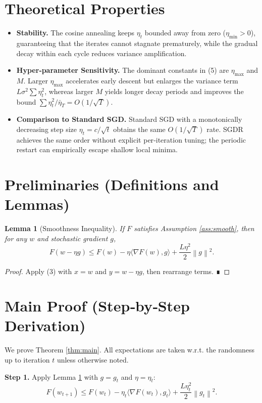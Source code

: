 \documentclass{article}
\newtheorem{lemma}{Lemma}
\newcommand{\norm}[1]{\left\|#1\right\|}
\newcommand{\ip}[2]{\langle #1,#2\rangle}
\begin{document}
\section*{Theoretical Properties}
\begin{itemize}[leftmargin=*]
\item \textbf{Stability.} The cosine annealing keeps $\eta_t$ bounded away from zero ($\eta_{\min}>0$), guaranteeing that the iterates cannot stagnate prematurely, while the gradual decay within each cycle reduces variance amplification.
\item \textbf{Hyper‑parameter Sensitivity.} The dominant constants in (5) are $\eta_{\max}$ and $M$. Larger $\eta_{\max}$ accelerates early descent but enlarges the variance term $L\sigma^2\sum\eta_t^2$, whereas larger $M$ yields longer decay periods and improves the bound $\sum\eta_t^2/\bar\eta_T=O(1/\sqrt{T})$.
\item \textbf{Comparison to Standard SGD.} Standard SGD with a monotonically decreasing step size $\eta_t=c/\sqrt{t}$ obtains the same $O(1/\sqrt{T})$ rate. SGDR achieves the same order without explicit per‑iteration tuning; the periodic restart can empirically escape shallow local minima.
\end{itemize}

\section*{Preliminaries (Definitions and Lemmas)}
\begin{lemma}[Smoothness Inequality]\label{lem:smooth}
If $F$ satisfies Assumption \ref{ass:smooth}, then for any $w$ and stochastic gradient $g$,
\[
F(w-\eta g)\le F(w)-\eta\ip{\nabla F(w)}{g}+\frac{L\eta^{2}}{2}\norm{g}^{2}.
\tag{7}
\]
\end{lemma}
\begin{proof}
Apply (3) with $x=w$ and $y=w-\eta g$, then rearrange terms. ∎
\end{proof}

\section*{Main Proof (Step‑by‑Step Derivation)}
We prove Theorem \ref{thm:main}. All expectations are taken w.r.t. the randomness up to iteration $t$ unless otherwise noted.

\noindent\textbf{Step 1.} Apply Lemma \ref{lem:smooth} with $g=g_t$ and $\eta=\eta_t$:
\[
F(w_{t+1})\le F(w_t)-\eta_t\ip{\nabla F(w_t)}{g_t}
          +\frac{L\eta_t^{2}}{2}\norm{g_t}^{2}.
\tag{8}
\]
\end{document}
